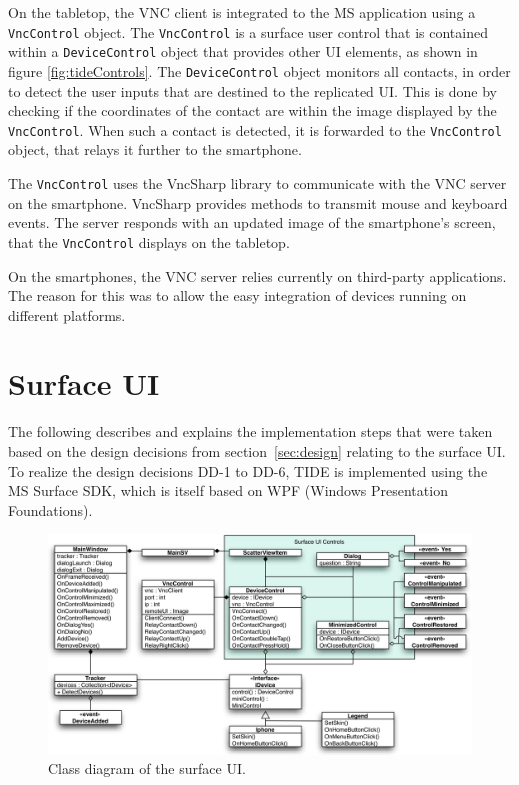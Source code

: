 
On the tabletop, the VNC client is integrated to the MS application using a \texttt{VncControl} object.
The \texttt{VncControl} is a surface user control that is contained within a \texttt{DeviceControl} object that provides other UI elements, as shown in figure \ref{fig:tideControls}.
The \texttt{DeviceControl} object monitors all contacts, in order to detect the user inputs that are destined to the replicated UI.
This is done by checking if the coordinates of the contact are within the image displayed by the \texttt{VncControl}.
When such a contact is detected, it is forwarded to the \texttt{VncControl} object, that relays it further to the smartphone.

The \texttt{VncControl} uses the VncSharp library to communicate with the VNC server on the smartphone.
VncSharp provides methods to transmit mouse and keyboard events.
The server responds with an updated image of the smartphone's screen, that the \texttt{VncControl} displays on the tabletop.

On the smartphones, the VNC server relies currently on third-party applications.
The reason for this was to allow the easy integration of devices running on different platforms.

\section{Surface UI}
\label{sec:surfaceui}

The following describes and explains the implementation steps that were taken based on the design decisions from section~\ref{sec:design} relating to the surface UI.
To realize the design decisions DD-1 to DD-6, TIDE is implemented using the MS Surface SDK, which is itself based on WPF (Windows Presentation Foundations).

\begin{figure}[htb]
  \centering
    \includegraphics[width=1\textwidth]{images/surfaceDiagram}
    \caption{Class diagram of the surface UI.}
    \label{fig:surfaceDiagram}
\end{figure}

